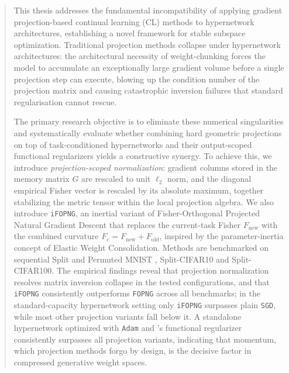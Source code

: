 \begin{abstract}
    This thesis addresses the fundamental incompatibility of applying gradient
    projection-based continual learning (CL) methods to hypernetwork architectures,
    establishing a novel framework for stable subspace optimization.  Traditional 
    projection methods collapse under hypernetwork architectures: the architectural 
    necessity of weight-chunking forces the model to accumulate an exceptionally large 
    gradient volume before a single projection step can execute, blowing up the condition
    number of the projection matrix and causing catastrophic inversion failures that 
    standard regularisation cannot rescue.
    
    The primary research objective is to eliminate these numerical singularities and
    systematically evaluate whether combining hard geometric projections on top of
    task-conditioned hypernetworks and their output-scoped functional regularizers
    yields a constructive synergy.  To achieve this, we introduce
    \emph{projection-scoped normalization}: gradient columns stored in the memory
    matrix $G$ are rescaled to unit $\ell_2$ norm, and the diagonal empirical Fisher
    vector is rescaled by its absolute maximum, together stabilizing the metric tensor
    within the local projection algebra.  We also introduce \texttt{iFOPNG}, an inertial
    variant of Fisher-Orthogonal Projected Natural Gradient Descent \citep{garg_fisher-orthogonal_2026}
    that replaces the current-task Fisher $F_{\text{new}}$ with the combined curvature
    $F_c = F_{\text{new}}+F_{\text{old}}$, inspired by the parameter-inertia concept
    of Elastic Weight Consolidation.  Methods are benchmarked on sequential Split and Permuted MNIST
    , Split-CIFAR10 and Split-CIFAR100. The empirical findings reveal that projection normalization
    resolves matrix inversion collapse in the tested configurations, and that \texttt{iFOPNG} consistently 
    outperforms \texttt{FOPNG} across all benchmarks; in the standard-capacity hypernetwork
    setting only \texttt{iFOPNG} surpasses plain \texttt{SGD}, while most other projection 
    variants fall below it.  A standalone hypernetwork optimized
    with \texttt{Adam} and \citeauthor{oswald_continual_2020}'s functional regularizer
    consistently surpasses all projection variants, indicating that momentum, which
    projection methods forgo by design, is the decisive factor in compressed generative
    weight spaces.
\end{abstract}

